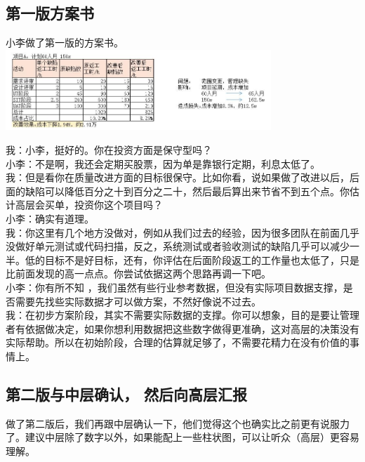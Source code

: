 \hypertarget{ux7b2cux4e00ux7248ux65b9ux6848ux4e66}{%
\subsection{第一版方案书}\label{ux7b2cux4e00ux7248ux65b9ux6848ux4e66}}

小李做了第一版的方案书。\\

\includegraphics[width=10cm]{方案书1.jpg}

我：小李，挺好的。你在投资方面是保守型吗？\\
小李：不是啊，我还会定期买股票，因为单是靠银行定期，利息太低了。\\
我：但是看你在质量改进方面的目标很保守。比如你看，说如果做了改进以后，后面的缺陷可以降低百分之十到百分之二十，然后最后算出来节省不到五个点。你估计高层会买单，投资你这个项目吗？\\
小李：确实有道理。\\
我：你这里有几个地方没做对，例如从我们过去的经验，因为很多团队在前面几乎没做好单元测试或代码扫描，反之，系统测试或者验收测试的缺陷几乎可以减少一半。低的目标不是好目标，还有，你评估在后面阶段返工的工作量也太低了，只是比前面发现的高一点点。你尝试依据这两个思路再调一下吧。\\
小李：你有所不知
，我们虽然有些行业参考数据，但没有实际项目数据支撑，是否需要先找些实际数据才可以做方案，不然好像说不过去。\\
我：在初步方案阶段，其实不需要实际数据的支撑。你可以想象，目的是要让管理者有依据做决定，如果你想利用数据把这些数字做得更准确，这对高层的决策没有实际帮助。所以在初始阶段，合理的估算就足够了，不需要花精力在没有价值的事情上。\\

\hypertarget{ux7b2cux4e8cux7248ux4e0eux4e2dux5c42ux786eux8ba4-ux7136ux540eux5411ux9ad8ux5c42ux6c47ux62a5}{%
\subsection{第二版与中层确认，
然后向高层汇报}\label{ux7b2cux4e8cux7248ux4e0eux4e2dux5c42ux786eux8ba4-ux7136ux540eux5411ux9ad8ux5c42ux6c47ux62a5}}

做了第二版后，我们再跟中层确认一下，他们觉得这个也确实比之前更有说服力了。建议中层除了数字以外，如果能配上一些柱状图，可以让听众（高层）更容易理解。\\

